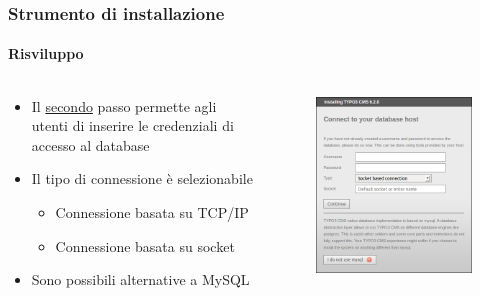 
\begin{frame}[fragile]
	\frametitle{Strumento di installazione}
	\framesubtitle{Risviluppo}

	\begin{columns}[T]

		\begin{column}{.5\textwidth}
			\begin{itemize}
				\item Il \underline{secondo} passo permette agli utenti di inserire le credenziali di accesso al database
				\item Il tipo di connessione è selezionabile
					\begin{itemize}
						\item Connessione basata su TCP/IP
						\item Connessione basata su socket
					\end{itemize}
				\item Sono possibili alternative a MySQL
			\end{itemize}
		\end{column}

		\begin{column}{.5\textwidth}
			\begin{figure}\vspace*{-0.4cm}
				\includegraphics[width=0.8\linewidth]{Images/InstallTool/DatabaseConnectionDetails.png}
			\end{figure}
		\end{column}

	\end{columns}

\end{frame}


